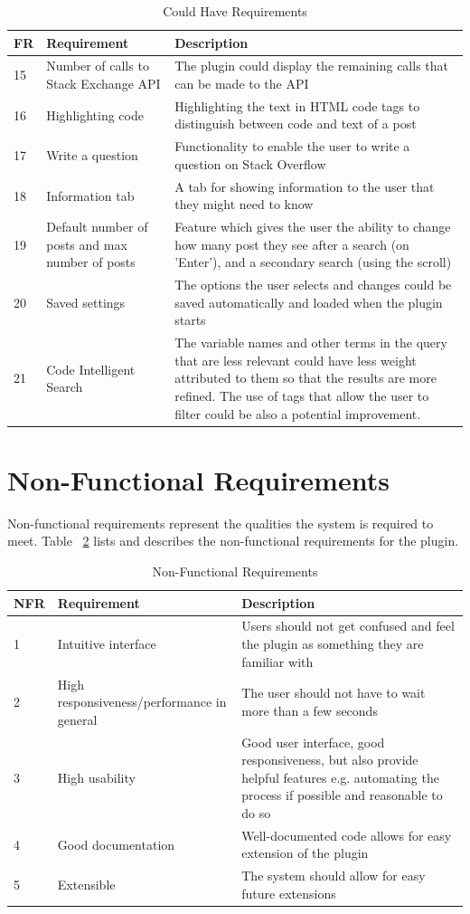\documentclass{l4proj}
\begin{document}
\begin{table}[H]
\caption{Could Have Requirements}
\centering
\def\arraystretch{1.5}
\begin{tabular}{p{2cm}p{4cm}p{9cm}}
\hline
FR & Requirement & Description \\
\hline
15 & Number of calls to Stack Exchange API & The plugin could display the remaining calls that can be made to the API\\
16 & Highlighting code & Highlighting the text in HTML code tags to distinguish between code and text of a post\\
17 & Write a question & Functionality to enable the user to write a question on Stack Overflow\\
18 & Information tab & A tab for showing information to the user that they might need to know\\
19 & Default number of posts and max number of posts & Feature which gives the user the ability to change how many post they see after a search (on 'Enter'), and a secondary search (using the scroll)\\
20 & Saved settings & The options the user selects and changes could be saved automatically and loaded when the plugin starts\\
21 & Code Intelligent Search & The variable names and other terms in the query that are less relevant could have less weight attributed to them so that the results are more refined. The use of tags that allow the user to filter could be also a potential improvement.\\
\hline
\end{tabular}
\label{table:couldTable}
\end{table}

\section{Non-Functional Requirements}
Non-functional requirements represent the qualities the system is required to meet. Table ~\ref{table:nonFuncTable}  lists and describes the non-functional requirements for the plugin.
\begin{table}[H]
\caption{Non-Functional Requirements}
\centering
\def\arraystretch{1.5}
\begin{tabular}{p{2cm}p{4cm}p{9cm}}
\hline
NFR & Requirement & Description \\
\hline
1 & Intuitive interface & Users should not get confused and feel the plugin as something they are familiar with \\
2 & High responsiveness/performance in general & The user should not have to wait more than a few seconds \\
3 & High usability & Good user interface, good responsiveness, but also provide helpful features e.g. automating the process if possible and reasonable to do so \\
4 & Good documentation & Well-documented code allows for easy extension of the plugin \\
5 & Extensible & The system should allow for easy future extensions\\
\hline
\end{tabular}
\label{table:nonFuncTable}
\end{table}
\end{document}
